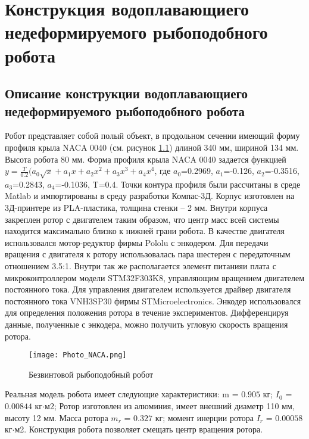 \chapter{Конструкция водоплавающиего недеформируемого рыбоподобного робота}\label{ch:ch6}

\section{Описание конструкции водоплавающиего недеформируемого рыбоподобного робота}

Робот представляет собой полый объект, в продольном сечении имеющий форму профиля крыла NACA 0040 (см. рисунок \ref{Photo_NACA}) длиной 340 мм, шириной 134 мм. Высота робота 80 мм. Форма профиля крыла NACA 0040 задается функцией 
$ y = \frac{T}{0.2}(a_0\sqrt{x} + a_1x + a_2x^2 + a_3x^3 + a_4x^4 $, где $a_0$=0.2969, $a_1$=-0.126, $a_2$=-0.3516, $a_3$=0.2843, $a_4$=-0.1036, T=0.4. Точки контура профиля были рассчитаны в среде Matlab и импортированы в среду разработки Компас-3Д.	
Корпус изготовлен на 3Д-принтере из PLA-пластика, толщина стенки -- 2 мм. Внутри корпуса закреплен ротор с двигателем таким образом, что центр масс всей системы находится максимально близко к нижней грани робота. В качестве двигателя использовался мотор-редуктор фирмы Pololu с энкодером. Для передачи вращения с двигателя к ротору использовалась пара шестерен с передаточным отношением 3.5:1. Внутри так же располагается элемент питанияи плата с микроконтроллером модели STM32F303K8, управляющим вращением двигателем постоянного тока. Для управления двигателем используется драйвер двигателя постоянного тока VNH3SP30 фирмы STMicroelectronics. Энкодер использовался для определения положения ротора в течение экспериментов. Дифференцируя данные, полученные с энкодера, можно получить угловую скорость вращения ротора.


\begin{figure}[h]
	\centering
	\texttt{[image: Photo\_NACA.png]}%
	\caption{Безвинтовой рыбоподобный робот}
	\label{Photo_NACA}
\end{figure}

Реальная модель робота имеет следующие характеристики: m = $0.905$ кг; $I_0$ = $0.00844$ кг$\cdot$м2; Ротор изготовлен из алюминия, имеет внешний диаметр 110 мм, высоту 12 мм. Масса ротора $m_r$ = $0.327$ кг; момент инерции ротора $I_r$ = $0.00058$ кг$\cdot$м2. Конструкция робота позволяет смещать центр вращения ротора.

